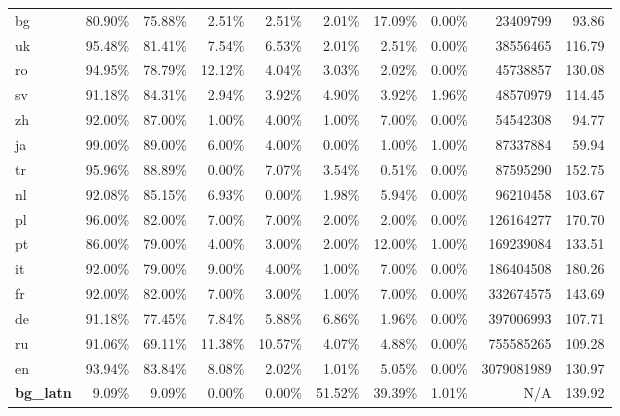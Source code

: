\begin{table*}[hbt!]
{\begin{tabular}{l|rrrr|rrr|rr}
            bg                & 80.90\% & 75.88\% & 2.51\%  & 2.51\%  & 2.01\%  & 17.09\% & 0.00\% & 23409799     & 93.86      \\
            uk                & 95.48\% & 81.41\% & 7.54\%  & 6.53\%  & 2.01\%  & 2.51\%  & 0.00\% & 38556465     & 116.79     \\
            ro                & 94.95\% & 78.79\% & 12.12\% & 4.04\%  & 3.03\%  & 2.02\%  & 0.00\% & 45738857     & 130.08     \\
            sv                & 91.18\% & 84.31\% & 2.94\%  & 3.92\%  & 4.90\%  & 3.92\%  & 1.96\% & 48570979     & 114.45     \\
            zh                & 92.00\% & 87.00\% & 1.00\%  & 4.00\%  & 1.00\%  & 7.00\%  & 0.00\% & 54542308     & 94.77      \\
            ja                & 99.00\% & 89.00\% & 6.00\%  & 4.00\%  & 0.00\%  & 1.00\%  & 1.00\% & 87337884     & 59.94      \\
            tr                & 95.96\% & 88.89\% & 0.00\%  & 7.07\%  & 3.54\%  & 0.51\%  & 0.00\% & 87595290     & 152.75     \\
            nl                & 92.08\% & 85.15\% & 6.93\%  & 0.00\%  & 1.98\%  & 5.94\%  & 0.00\% & 96210458     & 103.67     \\
            pl                & 96.00\% & 82.00\% & 7.00\%  & 7.00\%  & 2.00\%  & 2.00\%  & 0.00\% & 126164277    & 170.70     \\
            pt                & 86.00\% & 79.00\% & 4.00\%  & 3.00\%  & 2.00\%  & 12.00\% & 1.00\% & 169239084    & 133.51     \\
            it                & 92.00\% & 79.00\% & 9.00\%  & 4.00\%  & 1.00\%  & 7.00\%  & 0.00\% & 186404508    & 180.26     \\
            fr                & 92.00\% & 82.00\% & 7.00\%  & 3.00\%  & 1.00\%  & 7.00\%  & 0.00\% & 332674575    & 143.69     \\
            de                & 91.18\% & 77.45\% & 7.84\%  & 5.88\%  & 6.86\%  & 1.96\%  & 0.00\% & 397006993    & 107.71     \\
            ru                & 91.06\% & 69.11\% & 11.38\% & 10.57\% & 4.07\%  & 4.88\%  & 0.00\% & 755585265    & 109.28     \\
            en                & 93.94\% & 83.84\% & 8.08\%  & 2.02\%  & 1.01\%  & 5.05\%  & 0.00\% & 3079081989   & 130.97     \\
            \textbf{bg\_latn} & 9.09\%  & 9.09\%  & 0.00\%  & 0.00\%  & 51.52\% & 39.39\% & 1.01\% & N/A          & 139.92     \\

\end{tabular}}
\end{table*}
